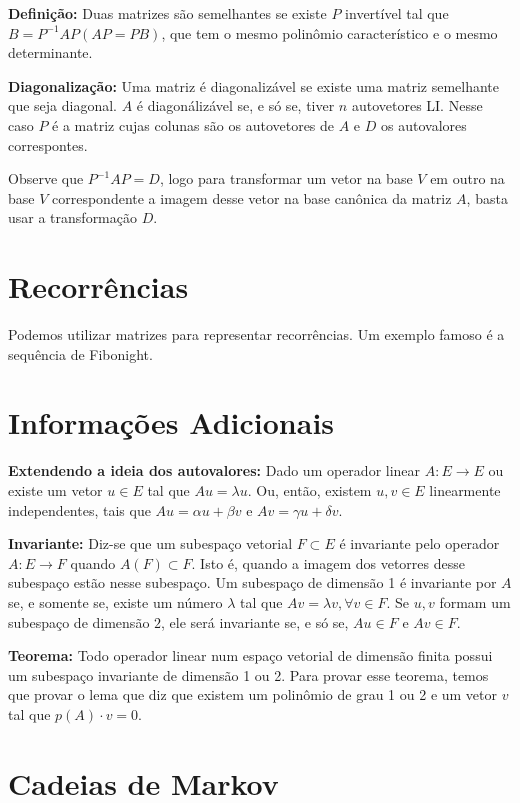 \documentclass[12pt,letterpaper]{article}
\begin{document}
\textbf{Definição:} Duas matrizes são semelhantes se existe $P$ invertível tal que $B = P^{-1}AP (AP = PB)$, que tem o mesmo polinômio característico e o mesmo determinante. 

\textbf{Diagonalização:} Uma matriz é diagonalizável se existe uma matriz semelhante que seja diagonal. $A$ é diagonálizável se, e só se, tiver $n$ autovetores LI. Nesse caso $P$ é a matriz cujas colunas são os autovetores de $A$ e $D$ os autovalores correspontes. 

Observe que $P^{-1}AP = D$, logo para transformar um vetor na base $V$ em outro na base $V$ correspondente a imagem desse vetor na base canônica da matriz $A$, basta usar a transformação $D$. 

\section{Recorrências}

Podemos utilizar matrizes para representar recorrências. Um exemplo famoso é a sequência de Fibonight. 

\section{Informações Adicionais}

\textbf{Extendendo a ideia dos autovalores:} Dado um operador linear $A: E \to E$ ou existe um vetor $u \in E$ tal que $Au = \lambda u$. Ou, então, existem $u, v \in E$ linearmente independentes, tais que $Au = \alpha u + \beta v$ e $Av = \gamma u + \delta v$. 

\textbf{Invariante:} Diz-se que um subespaço vetorial $F \subset E$ é invariante pelo operador $A: E \to F$ quando $A(F) \subset F$. Isto é, quando a imagem dos vetorres desse subespaço estão nesse subespaço. Um subespaço de dimensão 1 é invariante por $A$ se, e somente se, existe um número $\lambda$ tal que $Av = \lambda v, \forall v \in F$. Se $u,v$ formam um subespaço de dimensão $2$, ele será invariante se, e só se, $Au \in F$ e $Av \in F$. 

\textbf{Teorema:} Todo operador linear num espaço vetorial de dimensão finita possui um subespaço invariante de dimensão 1 ou 2. Para provar esse teorema, temos que provar o lema que diz que existem um polinômio de grau 1 ou 2 e um vetor $v$ tal que $p(A)\cdot v = 0$. 

\section{Cadeias de Markov}
\end{document}

